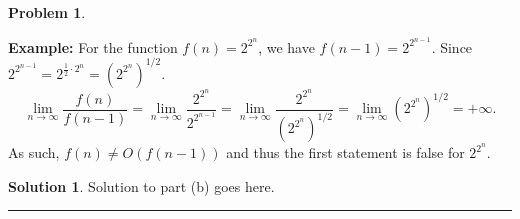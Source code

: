 \documentclass{article}
\theoremstyle{definition}
\newtheorem{problem}{Problem}
\def\fline{\rule{0.75\linewidth}{0.5pt}}
\newcommand{\finishline}{\begin{center}\fline\end{center}}
\newtheorem*{solution*}{Solution}
\newenvironment{solution}{\begin{solution*}}{{\finishline} \end{solution*}}
\begin{document}
\begin{problem}
\begin{enumerate}
    \smallskip
	\textbf{Example:} For the function $f(n) = 2^{2^n}$, we have $f(n-1) = 2^{2^{n-1}}$.  Since $2^{2^{n-1}}= 2^{\frac{1}{2} \cdot 2^n} = (2^{2^{n}})^{1/2}$.
	\[
		\lim_{n \to \infty}\frac{f(n)}{f(n-1)} = \lim_{n \to \infty}\frac{2^{2^{n}}}{2^{2^{n-1}}} = \lim_{n \to \infty}\frac{2^{2^{n}}}{(2^{2^{n}})^{1/2}} = \lim_{n \to \infty}(2^{2^{n}})^{1/2} = +\infty.
	\]	
	As such, $f(n) \neq O(f(n-1))$ and thus the first statement is false for $2^{2^n}$.

    \end{enumerate}
    
    \begin{solution}
	Solution to part (b) goes here. %
\end{solution}



\end{problem}


\smallskip
\end{document}
